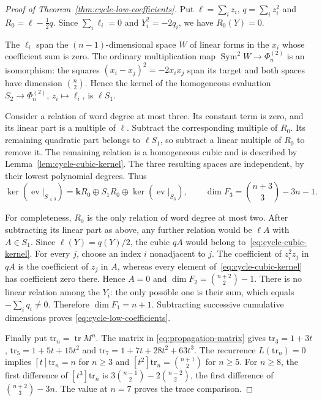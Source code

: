 \documentclass[reqno]{article}
\theoremstyle{plain} %
\theoremstyle{definition}
\theoremstyle{remark}
\newcommand{\K} {\mathbf{k}}
\numberwithin{equation}{section}
\begin{document}
\begin{proof}[Proof of Theorem~\ref{thm:cycle-low-coefficients}]
Put $\ell=\sum_i z_i$, $q=\sum_i z_i^2$ and
$R_0=\ell-\tfrac12q$. Since $\sum_i\ell_i=0$ and $Y_i^2=-2q_i$,
we have $R_0(Y)=0$.

The $\ell_i$ span the $(n-1)$-dimensional space $W$ of linear forms
in the $x_i$ whose coefficient sum is zero. The ordinary multiplication
map $\operatorname{Sym}^2W\to\Phi_n^{(2)}$ is an isomorphism: the
squares $(x_i-x_j)^2=-2x_ix_j$ span its target and both spaces have
dimension $\binom n2$. Hence the kernel of the homogeneous evaluation
$S_2\to\Phi_n^{(2)}$, $z_i\mapsto\ell_i$, is $\ell S_1$.

Consider a relation of word degree at most three. Its constant term is
zero, and its linear part is a multiple of $\ell$. Subtract the
corresponding multiple of $R_0$. Its remaining quadratic part belongs
to $\ell S_1$, so subtract a linear multiple of $R_0$ to remove it.
The remaining relation is a homogeneous cubic and is described by
Lemma~\ref{lem:cycle-cubic-kernel}. The three resulting spaces are
independent, by their lowest polynomial degrees. Thus
\[
 \ker(\operatorname{ev}|_{S_{\le3}})
 =\K R_0\oplus S_1R_0\oplus\ker(\operatorname{ev}|_{S_3}),
 \qquad
 \dim F_3=\binom{n+3}{3}-3n-1.
\]

For completeness, $R_0$ is the only relation of word degree at most
two. After subtracting its linear part as above, any further relation
would be $\ell A$ with $A\in S_1$. Since $\ell(Y)=q(Y)/2$, the cubic
$qA$ would belong to~\eqref{eq:cycle-cubic-kernel}. For every $j$, choose
an index $i$ nonadjacent to $j$. The coefficient of $z_i^2z_j$ in $qA$
is the coefficient of $z_j$ in $A$, whereas every element
of~\eqref{eq:cycle-cubic-kernel} has coefficient zero there. Hence
$A=0$ and $\dim F_2=\binom{n+2}{2}-1$. There is no linear relation
among the $Y_i$: the only possible one is their sum, which equals
$-\sum_iq_i\ne0$. Therefore $\dim F_1=n+1$.
Subtracting successive cumulative dimensions proves
\eqref{eq:cycle-low-coefficients}.

Finally put $\mathrm{tr}_n=\operatorname{tr}M^n$. The matrix in
\eqref{eq:propagation-matrix} gives
$\mathrm{tr}_3=1+3t$, $\mathrm{tr}_5=1+5t+15t^2$ and
$\mathrm{tr}_7=1+7t+28t^2+63t^3$. The recurrence $L(\mathrm{tr}_n)=0$ implies
$[t]\mathrm{tr}_n=n$ for $n\ge3$ and $[t^2]\mathrm{tr}_n=\binom{n+1}{2}$ for $n\ge5$.
For $n\ge8$, the first difference of $[t^3]\mathrm{tr}_n$ is
$3\binom{n-1}{2}-2\binom{n-2}{2}$, the first difference of
$\binom{n+2}{3}-3n$. The value at $n=7$ proves the trace comparison.
\end{proof}
\end{document}
